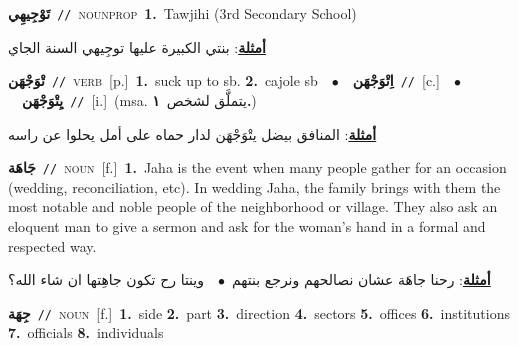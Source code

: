 \documentclass[10pt,a4paper,twoside]{article} %
\begin{document}
\begin{multicols}{2}
{\setlength\topsep{0pt}\textbf{\foreignlanguage{arabic}{تَوْجِيهِي}}\ {\color{gray}\texttt{//}\color{black}}\ \textsc{noun\textunderscore prop}\ \textbf{1.}~Tawjihi (3rd Secondary School)\  \begin{flushright}\color{gray}\foreignlanguage{arabic}{\textbf{\underline{\foreignlanguage{arabic}{أمثلة}}}: بنتي الكبيرة عليها توجِيهي السنة الجاي}\end{flushright}\color{black}} \vspace{2mm}

{\setlength\topsep{0pt}\textbf{\foreignlanguage{arabic}{تْوَجْهَن}}\ {\color{gray}\texttt{//}\color{black}}\ \textsc{verb}\ [p.]\ \textbf{1.}~suck up to sb.  \textbf{2.}~cajole sb\ \ $\bullet$\ \ \setlength\topsep{0pt}\textbf{\foreignlanguage{arabic}{اِتْوَجْهَن}}\ {\color{gray}\texttt{//}\color{black}}\ [c.]\ \ $\bullet$\ \ \setlength\topsep{0pt}\textbf{\foreignlanguage{arabic}{يِتْوَجْهَن}}\ {\color{gray}\texttt{//}\color{black}}\ [i.]\ \color{gray}(msa. \foreignlanguage{arabic}{يتملَّق لشخص}~\foreignlanguage{arabic}{\textbf{١.}})\color{black}\  \begin{flushright}\color{gray}\foreignlanguage{arabic}{\textbf{\underline{\foreignlanguage{arabic}{أمثلة}}}: المنافق بيضل يتْوَجْهَن لدار حماه على أمل يحلوا عن راسه}\end{flushright}\color{black}} \vspace{2mm}

{\setlength\topsep{0pt}\textbf{\foreignlanguage{arabic}{جَاهَة}}\ {\color{gray}\texttt{//}\color{black}}\ \textsc{noun}\ [f.]\ \textbf{1.}~Jaha is the event when many people gather for an occasion (wedding, reconciliation, etc). In wedding Jaha, the  family brings with them the most notable and noble people of the neighborhood or village. They also ask an eloquent man to give a sermon and ask for the woman's hand in a formal and respected way.\  \begin{flushright}\color{gray}\foreignlanguage{arabic}{\textbf{\underline{\foreignlanguage{arabic}{أمثلة}}}: رحنا جاهَة عشان نصالحهم ونرجع بنتهم\ $\bullet$\ \  وينتا رح تكون جاهِتها ان شاء الله؟}\end{flushright}\color{black}} \vspace{2mm}

{\setlength\topsep{0pt}\textbf{\foreignlanguage{arabic}{جِهَة}}\ {\color{gray}\texttt{//}\color{black}}\ \textsc{noun}\ [f.]\ \textbf{1.}~side  \textbf{2.}~part  \textbf{3.}~direction  \textbf{4.}~sectors  \textbf{5.}~offices  \textbf{6.}~institutions  \textbf{7.}~officials  \textbf{8.}~individuals\ } \vspace{2mm}


\end{multicols}
\end{document}
